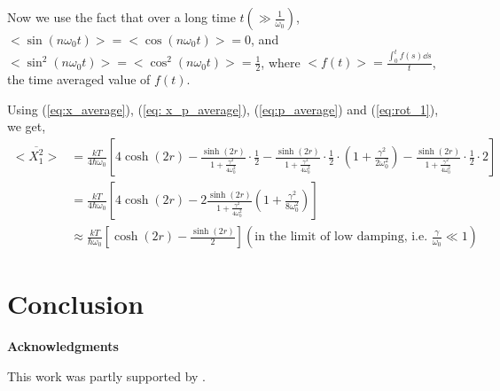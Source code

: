 \documentclass[12pt, twoside]{article}
\begin{document}
 
 Now we use the fact that over a long time $t (\gg \frac{1}{\omega_0})$, $<\sin(n\omega_0 t)> = <\cos(n \omega_0 t)> = 0$, and $<\sin^2(n\omega_0 t)> = <\cos^2(n \omega_0 t)> = \frac{1}{2}$, where $<f(t)> = \frac{\int_{0}^{t} f(s) \dd{s}}{t}$, the time averaged value of $f(t)$.
 
 Using (\ref{eq:x_average}), (\ref{eq: x_p_average}), (\ref{eq:p_average}) and (\ref{eq:rot_1}), we get,\\
 $\begin{aligned}
 <\overline { X _ { 1 } ^ { 2 } } > &= \frac{kT}{4\hbar\omega_0}\left[4\cosh(2r) - \frac{\sinh(2r)}{1+\frac{\gamma^2}{4\omega_0^2}}\cdot\frac{1}{2} - \frac{\sinh(2r)}{1+\frac{\gamma^2}{4\omega_0^2}}\cdot\frac{1}{2}\cdot\left(1+\frac{\gamma^2}{2\omega_0^2}\right)-\frac{\sinh(2r)}{1+\frac{\gamma^2}{4\omega_0^2}}\cdot\frac{1}{2}\cdot2 \right]
 \\ & = \frac{kT}{4\hbar\omega_0}\left[4\cosh(2r) - 2\frac{\sinh(2r)}{1+\frac{\gamma^2}{4\omega_0^2}}\left(1+\frac{\gamma^2}{8\omega_0^2}\right) \right]
 \\ & \approx \frac{kT}{\hbar\omega_0}\left[\cosh(2r) - \frac{\sinh(2r)}{2}\right] \left(\text{in the limit of low damping, i.e. } \frac{\gamma}{\omega_0} \ll 1\right)
 \end{aligned}$
\section{Conclusion}

\vspace{1.5cm}
\noindent \textbf{Acknowledgments}

\noindent \small{This work was partly supported by .}



\end{document}
